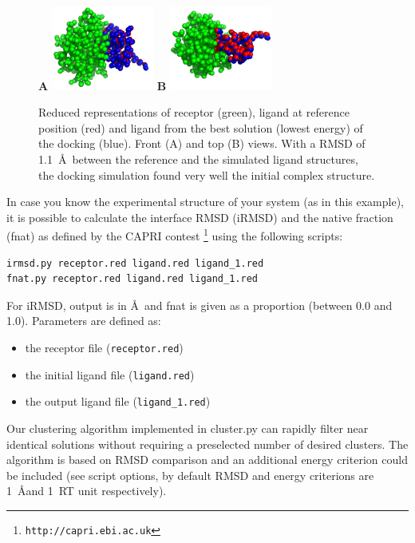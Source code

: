 \documentclass[12pt,a4paper]{article}
\begin{document}
\begin{figure}[htbp]
\center
{\textbf A}
\includegraphics*[width=0.30\textwidth]{img/1CGI_dock1_front.png}
\hspace*{2cm}
{\textbf B}
\includegraphics*[width=0.30\textwidth]{img/1CGI_dock1_top.png}
\caption{Reduced representations of receptor (green), ligand at reference position (red)
and ligand from the best solution (lowest energy) of the docking (blue). Front (A) and top (B) views.
With a RMSD of 1.1~\AA\ between the reference and the simulated ligand structures, the docking 
simulation found very well the initial complex structure.}
\end{figure}


In case you know the experimental structure of your system (as in this example), it is possible to calculate the
interface RMSD (iRMSD) and the native fraction (fnat) as defined by the CAPRI contest \footnote{\tt http://capri.ebi.ac.uk}
using the following scripts:

\begin{verbatim}
irmsd.py receptor.red ligand.red ligand_1.red
fnat.py receptor.red ligand.red ligand_1.red
\end{verbatim}

For iRMSD, output is in \AA\ and fnat is given as a proportion (between 0.0 and 1.0). Parameters are defined as:
\begin{itemize}
\item the receptor file ({\tt receptor.red})
\item the initial ligand file ({\tt ligand.red})
\item the output ligand file ({\tt ligand\_1.red})
\end{itemize}

Our clustering algorithm implemented in cluster.py can rapidly filter near identical solutions 
without requiring a preselected number of desired clusters.
The algorithm is based on RMSD comparison and an additional energy criterion could be included 
(see script options, by default RMSD and energy criterions are 1~\AA and 1~RT unit respectively).
\end{document}
